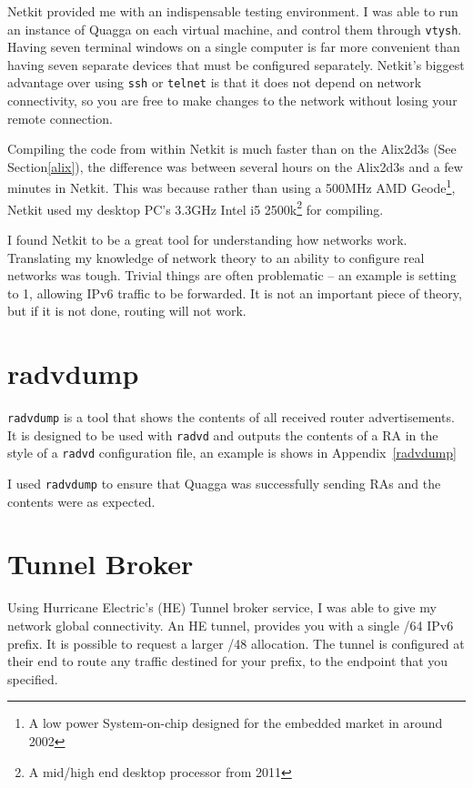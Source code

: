 \documentclass[12pt,a4paper,twoside]{report}
\begin{document}
Netkit provided me with an indispensable testing environment. I was able to run
an instance of Quagga on each virtual machine, and control them through
\texttt{vtysh}. Having seven terminal windows on a single computer is far more
convenient than having seven separate devices that must be configured
separately. Netkit's biggest advantage over using \texttt{ssh} or
\texttt{telnet} is that it does not depend on network connectivity, so you
are free to make changes to the network without losing your remote connection.

Compiling the code from within Netkit is much faster than on the Alix2d3s
(See Section\ref{alix}), the difference was between several hours on the
Alix2d3s and a few minutes in Netkit. This was because rather than using a
500MHz AMD Geode\footnote{A low power System-on-chip designed for the embedded
market in around 2002}, Netkit used my desktop PC's 3.3GHz Intel i5
2500k\footnote{A mid/high end desktop processor from 2011} for compiling. 

I found Netkit to be a great tool for understanding how networks work.
Translating my knowledge of network theory to an ability to configure real
networks was tough. Trivial things are often problematic -- an example
is setting  to 1, allowing IPv6
traffic to be forwarded. It is not an important piece of theory, but if it is
not done, routing will not work. 

\section{radvdump}
\texttt{radvdump} is a tool that shows the contents of all received router
advertisements. It is designed to be used with \texttt{radvd} and outputs the
contents of a RA in the style of a \texttt{radvd} configuration file, an
example is shows in Appendix~\ref{radvdump} 

I used \texttt{radvdump} to ensure that Quagga was successfully sending RAs and
the contents were as expected. 

\section{Tunnel Broker}
Using Hurricane Electric's (HE) Tunnel broker service, I was able to give my
network global connectivity. An HE tunnel, provides you with a single /64 IPv6
prefix. It is possible to request a larger /48 allocation. The tunnel is
configured at their end to route any traffic destined for your prefix, to the
endpoint that you specified.  
\end{document}
